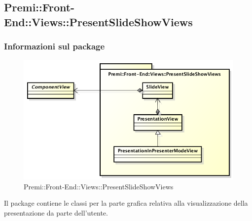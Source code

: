 \subsection{Premi::Front-End::Views::PresentSlideShowViews}
	\subsubsection*{Informazioni sul package}
	\begin{figure}[h]
		\centering
		\includegraphics[width=0.7\linewidth]{img/front-end_views_presentslideshowviews}
		\caption[Premi::Front-End::Views::PresentSlideShowViews]{Premi::Front-End::Views::PresentSlideShowViews}
	\end{figure}
	Il package contiene le classi per la parte grafica relativa alla visualizzazione della presentazione da parte dell'utente.

